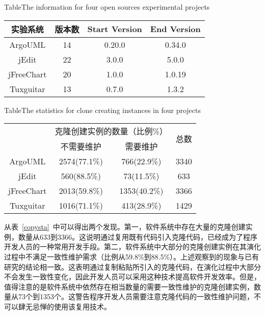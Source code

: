 \begin{table}[htbp]
{Table$\!$}{The information for four open sources experimental projects }
\vspace{0.5em}
\centering 
\wuhao
\begin{tabular}{cccc}
\toprule[1.5pt ]
{实验系统}&{版本数}&Start Version&End Version\\ 
\midrule[1pt]
ArgoUML&14&0.20.0&0.34.0\\ 
jEdit&22&3.0.0&5.0.0\\ 
jFreeChart&20&1.0.0&1.0.19\\ 
Tuxguitar&13&0.7.0&1.3.2\\ 
\bottomrule[1.5pt]
\end{tabular}
\end{table}

\begin{table}[htbp]
{Table$\!$}{The statistics for clone creating instances in four projects}
\vspace{0.5em}
\centering
\wuhao
\begin{tabular}{cccc}
\toprule[1.5pt]
~\multirow{2}{*}{实验系统}& \multicolumn{2}{c}{克隆创建实例的数量（比例\%）} & \multirow{2}{*}{总数}\\ 
~&{不需要维护} &{需要维护}&~\\
\midrule[1pt]
ArgoUML&	2574(77.1\%)&	766(22.9\%)&	3340\\
jEdit&	560(88.5\%)&	73(11.5\%)&	633\\
jFreeChart&	2013(59.8\%)&	1353(40.2\%)&	3366\\
Tuxguitar&	1016(71.1\%)&	413(28.9\%)&	1429\\
\bottomrule[1.5pt]
\end{tabular}
\end{table}

从表~\ref{copysta}~中可以得出两个发现。第一，软件系统中存在大量的克隆创建实例，数量从633到3366。这说明通过复用既有代码引入克隆代码，已经成为了程序开发人员的一种常用开发手段。第二，软件系统中大部分的克隆创建实例在其演化过程中不满足一致性维护需求（比例从59.8\%到88.5\%）。上述观察到的现象与已有研究的结论相一致\cite{wang2014predicting}\cite{gode2011frequency}。这表明通过复制粘贴所引入的克隆代码，在演化过程中大部分不会发生一致性变化，因此开发人员可以采用这种技术提高软件开发效率。但是，值得注意的是软件系统中依然存在相当数量的需要一致性维护的克隆创建实例，数量从73个到1353个。这警告程序开发人员需要注意克隆代码的一致性维护问题，不可以肆无忌惮的使用该复用技术。

